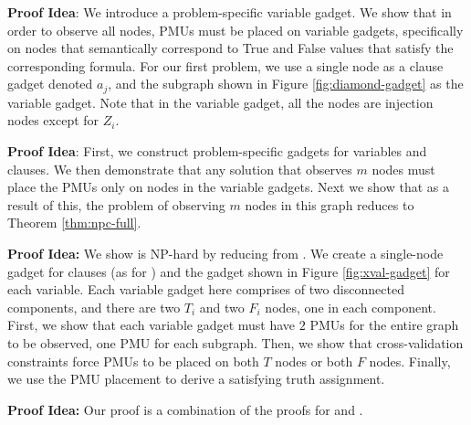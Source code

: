 

{\bf \full Proof Idea}:  We introduce a problem-specific variable gadget. We show that in order to observe all nodes, PMUs must be placed on variable gadgets, specifically on
nodes that semantically correspond to True and False values that satisfy the corresponding \sat formula. 
For our first problem, we use a single node as a clause gadget denoted $a_j$, and the subgraph shown in Figure \ref{fig:diamond-gadget} as the variable gadget. Note that in the variable gadget, all the nodes are injection nodes except for $Z_i$.

{\bf \maxinc Proof Idea}: First, we construct problem-specific gadgets for variables and clauses. We then demonstrate that any solution that observes $m$ nodes must place the PMUs only on nodes
in the variable gadgets. Next we show that as a result of this, the problem of observing $m$ nodes in this graph reduces to Theorem \ref{thm:npc-full}.

{\bf \xval Proof Idea:}   We show \xval is NP-hard by reducing from \sats.  
We create a single-node gadget for clauses (as for \fulls) and the gadget shown in Figure \ref{fig:xval-gadget} for each variable. Each variable gadget here comprises of two disconnected components, 
and there are two $T_i$ and two $F_i$ nodes, one in each component. First, we show that each variable gadget must have $2$ PMUs for the entire graph to be observed, one PMU for each subgraph.
Then, we show that cross-validation constraints force PMUs to be placed on both $T$ nodes or both $F$ nodes.  Finally, we use the PMU placement to derive a satisfying \sat truth assignment.

{\bf \xvalpart Proof Idea:} Our proof is a combination of the proofs for \maxinc and \xvals.
